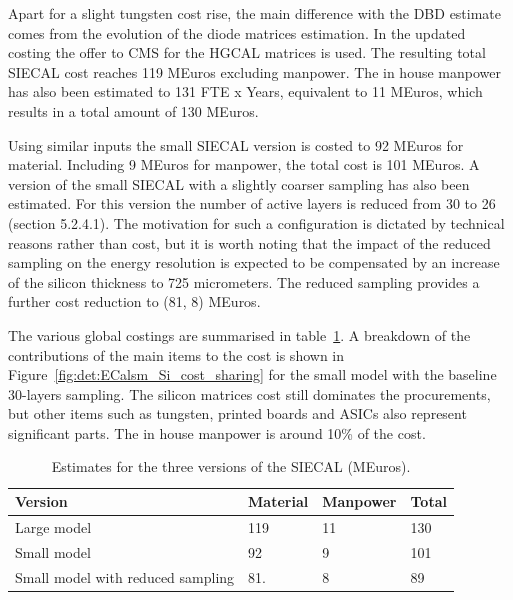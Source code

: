 Apart for a slight tungsten cost rise, the main difference with the DBD estimate comes from the evolution of the diode matrices estimation. In the updated costing the offer to CMS for the HGCAL matrices is used. The resulting total SIECAL cost reaches 119 MEuros excluding manpower. The in house manpower has also been estimated to 131 FTE x Years, equivalent to 11 MEuros, which results in a total amount of 130 MEuros.

Using similar inputs the small SIECAL version is costed to 92 MEuros for material. Including 9 MEuros for manpower, the total cost is 101 MEuros. 
A version of the small SIECAL with a slightly coarser sampling has also been estimated. For this version the number of active layers is reduced from 30 to 26 (section 5.2.4.1). The motivation for such a configuration is dictated by technical reasons rather than cost, but it is worth noting that the impact of the reduced sampling on the energy resolution is expected to be compensated by an increase of the silicon thickness to 725 micrometers. The reduced sampling provides a further cost reduction to (81, 8) MEuros.  

The various global costings are summarised in table~\ref{ECal_summary}. A breakdown of the contributions of the main items to the cost is shown in Figure~\ref{fig:det:ECalsm_Si_cost_sharing} for the small model with the baseline 30-layers sampling. The silicon matrices cost still dominates the procurements, but other items such as tungsten, printed boards and ASICs also represent significant parts. The in house manpower is around 10\% of the cost.

\begin{table}\hspace*{-0cm}\small 
\begin{tabular}[h!]{ l p{0.2\hsize}p{0.2\hsize}p{0.2\hsize} }
\toprule
Version& Material & Manpower & Total \\
\midrule
Large model                       & 119   & 11    & 130   \\
Small model                       & 92    &  9    & 101   \\
Small model with reduced sampling & 81.   &  8    & 89  \\
\bottomrule
\end{tabular}
\caption{\label{ECal_summary}Estimates for the three versions of the SIECAL (MEuros).}
\end{table}

